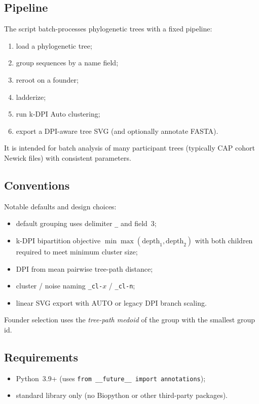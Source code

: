 \documentclass[11pt,a4paper]{article}
\begin{document}
\subsection{Pipeline}
The script batch-processes phylogenetic trees with a fixed pipeline:
\begin{enumerate}[nosep]
  \item load a phylogenetic tree;
  \item group sequences by a name field;
  \item reroot on a founder;
  \item ladderize;
  \item run k-DPI Auto clustering;
  \item export a DPI-aware tree SVG (and optionally annotate FASTA).
\end{enumerate}
It is intended for batch analysis of many participant trees (typically CAP
cohort Newick files) with consistent parameters.

\subsection{Conventions}
Notable defaults and design choices:
\begin{itemize}[nosep]
  \item default grouping uses delimiter \texttt{\_} and field~3;
  \item k-DPI bipartition objective
        $\min\max(\mathrm{depth}_1,\mathrm{depth}_2)$
        with both children required to meet minimum cluster size;
  \item DPI from mean pairwise tree-path distance;
  \item cluster / noise naming \texttt{\_cl-}$x$ / \texttt{\_cl-n};
  \item linear SVG export with AUTO or legacy DPI branch scaling.
\end{itemize}
Founder selection uses the \emph{tree-path medoid} of the group with the
smallest group id.

\subsection{Requirements}
\begin{itemize}[nosep]
  \item Python~3.9+ (uses \texttt{from \_\_future\_\_ import annotations});
  \item standard library only (no Biopython or other third-party packages).
\end{itemize}
\end{document}
